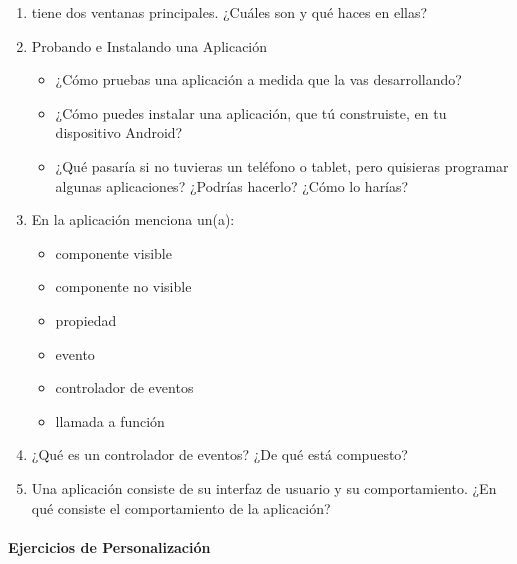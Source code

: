 \documentclass[letterpaper]{article}
\begin{document}
\begin{enumerate}

\item \AppInventor tiene dos ventanas principales. ¿Cuáles son y qué
  haces en ellas?

\item Probando e Instalando una Aplicación

  \begin{itemize}

  \item ¿Cómo pruebas una aplicación a medida que la vas desarrollando?

  \item ¿Cómo puedes instalar una aplicación, que tú construiste, en
    tu dispositivo Android?

  \item ¿Qué pasaría si no tuvieras un teléfono o tablet, pero
    quisieras programar algunas aplicaciones? ¿Podrías hacerlo? ¿Cómo
    lo harías?

  \end{itemize}

\item En la aplicación  menciona un(a):

  \begin{itemize}
  
  \item componente visible

  \item componente no visible

  \item propiedad

  \item evento

  \item controlador de eventos

  \item llamada a función

  \end{itemize}

\item ¿Qué es un controlador de eventos? ¿De qué está compuesto?

\item Una aplicación consiste de su interfaz de usuario y su
  comportamiento. ¿En qué consiste el comportamiento de la aplicación?

\end{enumerate}

\paragraph{Ejercicios de Personalización}
\end{document}
